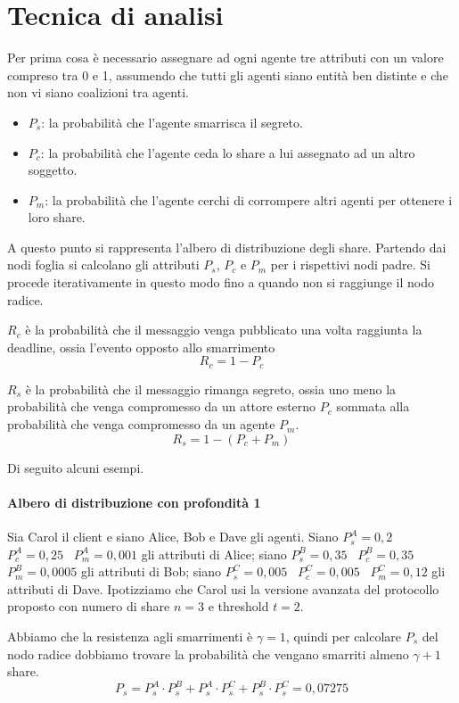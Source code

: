 \section{Tecnica di analisi}
Per prima cosa è necessario assegnare ad ogni agente tre attributi con un valore
compreso tra 0 e 1, assumendo che tutti gli agenti siano entità ben distinte e
che non vi siano coalizioni tra agenti.

\begin{itemize}
	\item $ P_s $: la probabilità
	      che l'agente smarrisca il segreto.
	\item $ P_c $: la probabilità che l'agente ceda
	      lo share a lui assegnato ad un altro soggetto.
	\item $ P_m $: la probabilità che l'agente cerchi di
	      corrompere altri agenti per ottenere i loro share.
\end{itemize}

A questo punto si rappresenta l'albero di distribuzione degli share.
Partendo dai nodi foglia si calcolano gli attributi $ P_s $, $ P_c $ e $ P_m $
per i rispettivi nodi padre. Si procede iterativamente in questo modo
fino a quando non si raggiunge il nodo radice.

$ R_c $ è la probabilità che il messaggio venga
pubblicato una volta raggiunta la deadline, ossia l'evento opposto allo smarrimento
$$ R_c = 1 - P_c $$

$ R_s $ è la probabilità che il messaggio rimanga segreto, ossia uno meno la probabilità che venga compromesso
da un attore esterno $ P_c $ sommata alla probabilità che venga compromesso da un agente $ P_m $.
$$ R_s = 1 - (P_c + P_m) $$


Di seguito alcuni esempi.

\paragraph{Albero di distribuzione con profondità 1}
Sia Carol il client e siano Alice, Bob e Dave gli agenti.
Siano
$ P_s^A = 0,2 $ \,
$ P_c^A = 0,25 $ \,
$ P_m^A = 0,001 $
gli attributi di Alice;
siano
$ P_s^B = 0,35 $ \,
$ P_c^B = 0,35 $ \,
$ P_m^B = 0,0005 $
gli attributi di Bob;
siano
$ P_s^C = 0,005 $ \,
$ P_c^C = 0,005 $ \,
$ P_m^C = 0,12 $
gli attributi di Dave.
Ipotizziamo che Carol usi la versione avanzata del protocollo
proposto con numero di share $ n = 3 $ e threshold $ t = 2 $.

Abbiamo che la resistenza agli smarrimenti è $ \gamma = 1 $, quindi per calcolare $ P_s $ del nodo
radice dobbiamo trovare la probabilità che vengano smarriti almeno $ \gamma + 1 $ share.
$$ P_s = P_s^A \cdot P_s^B + P_s^A \cdot P_s^C + P_s^B \cdot P_s^C = 0,07275 $$

